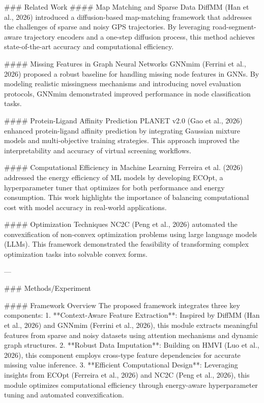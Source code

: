 ### Related Work
#### Map Matching and Sparse Data
DiffMM (Han et al., 2026) introduced a diffusion-based map-matching framework that addresses the challenges of sparse and noisy GPS trajectories. By leveraging road-segment-aware trajectory encoders and a one-step diffusion process, this method achieves state-of-the-art accuracy and computational efficiency.

#### Missing Features in Graph Neural Networks
GNNmim (Ferrini et al., 2026) proposed a robust baseline for handling missing node features in GNNs. By modeling realistic missingness mechanisms and introducing novel evaluation protocols, GNNmim demonstrated improved performance in node classification tasks.

#### Protein-Ligand Affinity Prediction
PLANET v2.0 (Gao et al., 2026) enhanced protein-ligand affinity prediction by integrating Gaussian mixture models and multi-objective training strategies. This approach improved the interpretability and accuracy of virtual screening workflows.

#### Computational Efficiency in Machine Learning
Ferreira et al. (2026) addressed the energy efficiency of ML models by developing ECOpt, a hyperparameter tuner that optimizes for both performance and energy consumption. This work highlights the importance of balancing computational cost with model accuracy in real-world applications.

#### Optimization Techniques
NC2C (Peng et al., 2026) automated the convexification of non-convex optimization problems using large language models (LLMs). This framework demonstrated the feasibility of transforming complex optimization tasks into solvable convex forms.

---

### Methods/Experiment

#### Framework Overview
The proposed framework integrates three key components:
1. **Context-Aware Feature Extraction**: Inspired by DiffMM (Han et al., 2026) and GNNmim (Ferrini et al., 2026), this module extracts meaningful features from sparse and noisy datasets using attention mechanisms and dynamic graph structures.
2. **Robust Data Imputation**: Building on HMVI (Luo et al., 2026), this component employs cross-type feature dependencies for accurate missing value inference.
3. **Efficient Computational Design**: Leveraging insights from ECOpt (Ferreira et al., 2026) and NC2C (Peng et al., 2026), this module optimizes computational efficiency through energy-aware hyperparameter tuning and automated convexification.

